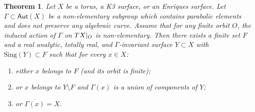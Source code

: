 \documentclass[11pt]{article}
\newenvironment{enumeratea}
{\bgroup\def\theenumi{\alph{enumi}}\begin{enumerate}}
{\end{enumerate}\egroup}
\newcommand{\rest}[1]{ \arrowvert_{#1}}
\newcommand{\Sing}{{\mathrm{Sing}}}
\newcommand\Aut{\mathsf{Aut}}
\theoremstyle{plain}
\newtheorem{thm}{Theorem}[section]
\theoremstyle{definition}
\numberwithin{equation}{section}
\begin{document}
\begin{thm}\label{thm:orbit_closures}
Let $X$ be a torus, a K3 surface, or an Enriques surface.
Let $\Gamma\subset \Aut(X)$ be a non-elementary subgroup which contains parabolic elements and does not
preserve any algebraic curve. Assume
that for any finite orbit $O$, the induced action of $\Gamma$ on $TX\rest{O}$ is non-elementary.
Then there exists a finite set $F$ and a real analytic,
totally real, and $\Gamma$-invariant surface $Y \subset X$ with $\Sing(Y)\subset F$
such that for every $x\in X$:
\begin{enumeratea}
\item\label{thm:orbit_closuresa} either $x$ belongs to $F$ (and its orbit is finite);
\item\label{thm:orbit_closuresb} or $x$ belongs to $Y\setminus F$ and $\overline{ \Gamma (x)}$ is a union of components of $Y$;
\item\label{thm:orbit_closuresc} or $\overline{ \Gamma (x)} =X$.
\end{enumeratea}
\end{thm}
\end{document}
